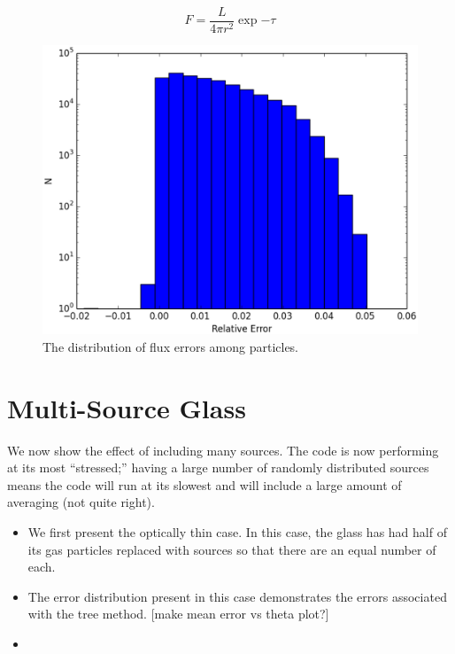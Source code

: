 \begin{equation}
\label{eq:thickflux}
F = \frac{L}{4\pi r^2} \exp{-\tau}
\end{equation}

\begin{figure}
\includegraphics[width=\textwidth]{graphics/error.eps}
\caption[Error distribution for a single source in a uniform field.]{The distribution of flux errors among particles.}
\label{fig:thickglasserrors}
\end{figure}

\section{Multi-Source Glass}
\label{sec:multiglass}

We now show the effect of including many sources. The code is now performing at its most ``stressed;'' having a large number of randomly distributed sources means the code will run at its slowest and will include a large amount of averaging (not quite right).

\begin{itemize}
\item We first present the optically thin case. In this case, the glass has had half of its gas particles replaced with sources so that there are an equal number of each.
\item The error distribution present in this case demonstrates the errors associated with the tree method. [make mean error vs theta plot?]
\item 
\end{itemize}

